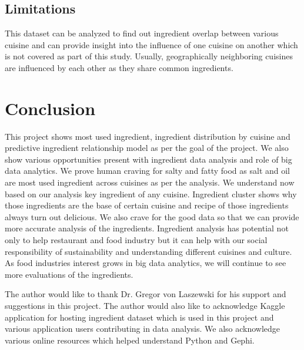 \documentclass[sigconf]{acmart}
\begin{document}
\subsection{Limitations}
This dataset can be analyzed to find out ingredient overlap between various cuisine and can provide insight into the influence of one cuisine on another which is not covered as part of this study. Usually, geographically neighboring cuisines are influenced by each other as they share common ingredients. 

\section{Conclusion}
This project shows most used ingredient, ingredient distribution by cuisine and predictive ingredient relationship model as per the goal of the project. We also show various opportunities present with ingredient data analysis and role of big data analytics. We prove human craving for salty and fatty food as salt and oil are most used ingredient across cuisines as per the analysis. We understand now based on our analysis key ingredient of any cuisine. Ingredient cluster shows why those ingredients are the base of certain cuisine and recipe of those ingredients always turn out delicious. We also crave for the good data so that we can provide more accurate analysis of the ingredients. Ingredient analysis has potential not only to help restaurant and food industry but it can help with our social responsibility of sustainability and understanding different cuisines and culture. As food industries interest grows in big data analytics, we will continue to see more evaluations of the ingredients.  

\begin{acks}
  The author would like to thank Dr. Gregor von Laszewski for his support and suggestions in this project. The author would also like to acknowledge Kaggle application for hosting ingredient dataset which is used in this project and various application users contributing in data analysis. We also acknowledge various online resources which helped understand Python and Gephi.  
\end{acks}


 

\appendix
\end{document}
